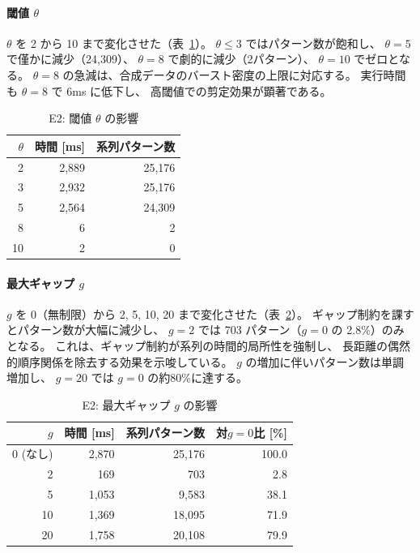 \documentclass[11pt,a4paper]{article}
\begin{document}
\paragraph{閾値 $\theta$}
$\theta$ を 2 から 10 まで変化させた（表~\ref{tab:threshold}）。
$\theta \le 3$ ではパターン数が飽和し、
$\theta = 5$ で僅かに減少（24,309）、
$\theta = 8$ で劇的に減少（2パターン）、
$\theta = 10$ でゼロとなる。
$\theta = 8$ の急減は、合成データのバースト密度の上限に対応する。
実行時間も $\theta = 8$ で 6ms に低下し、
高閾値での剪定効果が顕著である。

\begin{table}[t]
\centering
\caption{E2: 閾値 $\theta$ の影響}
\label{tab:threshold}
\begin{tabular}{rrr}
\toprule
$\theta$ & 時間 [ms] & 系列パターン数 \\
\midrule
2  & 2,889 & 25,176 \\
3  & 2,932 & 25,176 \\
5  & 2,564 & 24,309 \\
8  &     6 & 2 \\
10 &     2 & 0 \\
\bottomrule
\end{tabular}
\end{table}

\paragraph{最大ギャップ $g$}
$g$ を 0（無制限）から 2, 5, 10, 20 まで変化させた（表~\ref{tab:gap}）。
ギャップ制約を課すとパターン数が大幅に減少し、
$g = 2$ では 703 パターン（$g=0$ の 2.8\%）のみとなる。
これは、ギャップ制約が系列の時間的局所性を強制し、
長距離の偶然的順序関係を除去する効果を示唆している。
$g$ の増加に伴いパターン数は単調増加し、
$g = 20$ では $g=0$ の約80\%に達する。

\begin{table}[t]
\centering
\caption{E2: 最大ギャップ $g$ の影響}
\label{tab:gap}
\begin{tabular}{rrrr}
\toprule
$g$ & 時間 [ms] & 系列パターン数 & 対$g{=}0$比 [\%] \\
\midrule
0 (なし) & 2,870 & 25,176 & 100.0 \\
2        &   169 &    703 & 2.8 \\
5        & 1,053 &  9,583 & 38.1 \\
10       & 1,369 & 18,095 & 71.9 \\
20       & 1,758 & 20,108 & 79.9 \\
\bottomrule
\end{tabular}
\end{table}
\end{document}
